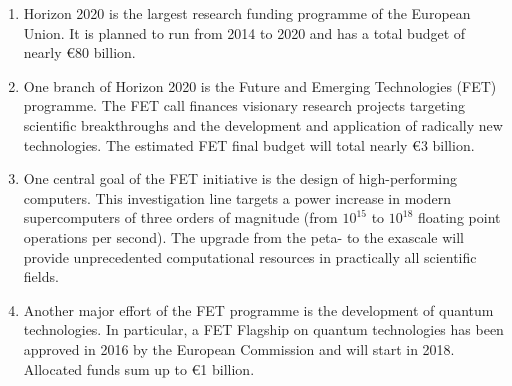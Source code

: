 \begin{enumerate}
 \item Horizon 2020 is the largest research funding programme of the European Union. It is planned to run from 2014 to 2020 and has a total budget of nearly \euro 80 billion. 
 \item One branch of Horizon 2020 is the Future and Emerging Technologies (FET) programme. The FET call finances visionary research projects targeting scientific breakthroughs and the development and application of radically new technologies. The estimated FET final budget will total nearly \euro 3 billion. 
 \item One central goal of the FET initiative is the design of high-performing computers. This investigation line targets a power increase in modern supercomputers of three orders of magnitude (from $10^{15}$ to $10^{18}$ floating point operations per second). The upgrade from the peta- to the exascale will provide unprecedented computational resources in practically all scientific fields.
 \item Another major effort of the FET programme is the development of quantum technologies. In particular, a FET Flagship on quantum technologies has been approved in 2016 by the European Commission and will start in 2018. Allocated funds sum up to \euro 1 billion.    
\end{enumerate}